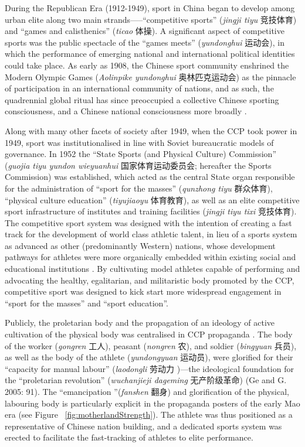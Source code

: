 \begin{CJK}{UTF8}{gbsn}
During the Republican Era (1912-1949), sport in China began to develop among urban elite along two main strands—--``competitive sports'' (\textit{jingji tiyu} 竞技体育) and ``games and calisthenics'' (\textit{ticao} 体操).  A significant aspect of competitive sports was the public spectacle of the ``games meets'' (\textit{yundonghui} 运动会), in which the performance of emerging national and international political identities could take place.  As early as 1908, the Chinese sport community enshrined the Modern Olympic Games (\textit{Aolinpike yundonghui} 奥林匹克运动会) as the pinnacle of participation in an international community of nations, and as such, the quadrennial global ritual has since preoccupied a collective Chinese sporting consciousness, and a Chinese national consciousness more broadly \citep{Jarvie2008;Barme2009;Brownell2008;Morris2004}.

Along with many other facets of society after 1949, when the CCP took power in 1949, sport was institutionalised in line with Soviet bureaucratic models of governance.  In 1952 the ``State Sports (and Physical Culture) Commission'' (\textit{guojia tiyu yundon wieyuanhui} 国家体育运动委员会; hereafter the Sports Commission) was established, which acted as the central State organ responsible for the administration of ``sport for the masses'' (\textit{qunzhong tiyu} 群众体育), ``physical culture education'' (\textit{tiyujiaoyu} 体育教育), as well as an elite competitive sport infrastructure of institutes and training facilities (\textit{jingji tiyu tixi} 竞技体育).
The competitive sport system was designed with the intention of creating a fast track for the development of world class athletic talent, in lieu of a sports system as advanced as other (predominantly Western) nations, whose development pathways for athletes were more organically embedded within existing social and educational institutions \citep{Brownell2008}.  By cultivating model athletes capable of performing and advocating the healthy, egalitarian, and militaristic body promoted by the CCP, competitive sport was designed to kick start more widespread engagement in ``sport for the masses'' and ``sport education''\citep[56]{Brownell1995}.

Publicly, the proletarian body and the propagation of an ideology of active cultivation of the physical body was centralised in CCP propaganda \citep[58]{Brownell1995}.  The body of the worker (\textit{gongren} 工人), peasant (\textit{nongren} 农), and soldier (\textit{bingyuan} 兵员), as well as the body of the athlete (\textit{yundongyuan} 运动员), were glorified for their ``capacity for manual labour'' (\textit{laodongli} 劳动力 )---the ideological foundation for the ``proletarian revolution'' (\textit{wuchanjieji dageming} 无产阶级革命) (Ge and G. 2005: 91).
The ``emancipation ''(\textit{fanshen} 翻身) and glorification of the physical, labouring body is particularly explicit in the propaganda posters of the early Mao era \citep[87]{Ge2005} (see Figure ~\ref{fig:motherlandStrength}).  The athlete was thus positioned as a representative of Chinese nation building, and a dedicated sports system was erected to facilitate the fast-tracking of athletes to elite performance.


\end{CJK}
